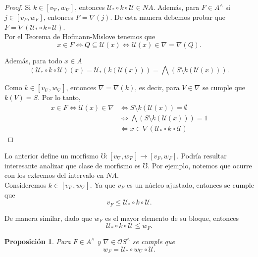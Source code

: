 \documentclass[12pt]{article}
\newtheorem{prop}[thm]{Proposición}
\begin{document}
\begin{proof}
Si $k\in [v_\nabla, w_\nabla]$, entonces $\mathcal{U}_*\circ k\circ \mathcal{U}\in NA$. Además, para $F\in A^\wedge$ si $j\in [v_F, w_F]$, entonces $F=\nabla(j)$. De esta manera debemos probar que $F=\nabla(\mathcal{U}_*\circ k\circ \mathcal{U})$.\\

Por el Teorema de Hofmann-Mislove tenemos que
\[
x\in F\iff Q\subseteq \mathcal{U}(x)\iff \mathcal{U}(x)\in \nabla=\nabla(Q).
\]

Además, para todo $x\in A$
\[
(\mathcal{U}_*\circ k\circ\mathcal{U})(x)=\mathcal{U}_*(k(\mathcal{U}(x)))=\bigwedge(S\setminus k(\mathcal{U}(x))).
\]

Como $k\in [v_\nabla, w_\nabla]$, entonces $\nabla=\nabla(k)$, es decir, para $V\in \nabla$ se cumple que $k(V)=S$. Por lo tanto,
\[
\begin{split}
x\in F\iff \mathcal{U}(x)\in \nabla &\iff S\setminus k(\mathcal{U}(x))=\emptyset\\
&\iff \bigwedge(S\setminus k(\mathcal{U}(x)))=1\\
&\iff x\in \nabla(\mathcal{U}_*\circ k\circ \mathcal{U})
\end{split}
\]
\end{proof}

Lo anterior define un morfismo $\mho\colon [v_\nabla, w_\nabla]\to [v_F, w_F]$. Podría resultar interesante analizar que clase de morfismo es $\mho$. 
Por ejemplo, notemos que ocurre con los extremos del intervalo en $NA$.\\

Consideremos $k\in [v_\nabla, w_\nabla]$. Ya que $v_F$ es un núcleo ajustado, entonces se cumple que 
\begin{equation}\label{comparacionvF}
v_F\leq \mathcal{U}_*\circ k\circ \mathcal{U}. 
\end{equation}

De manera similar, dado que $w_F$ es el mayor elemento de su bloque, entonces
\begin{equation}\label{comparacionwF}
\mathcal{U}_*\circ k\circ \mathcal{U}\leq w_F.
\end{equation}

\begin{prop}\label{igualdadwF}
Para $F\in A^\wedge$ y $\nabla\in \mathcal{O}S^\wedge$ se cumple que 
\[
w_F=\mathcal{U}_*\circ w_\nabla\circ \mathcal{U}.
\]
\end{prop}
\end{document}
